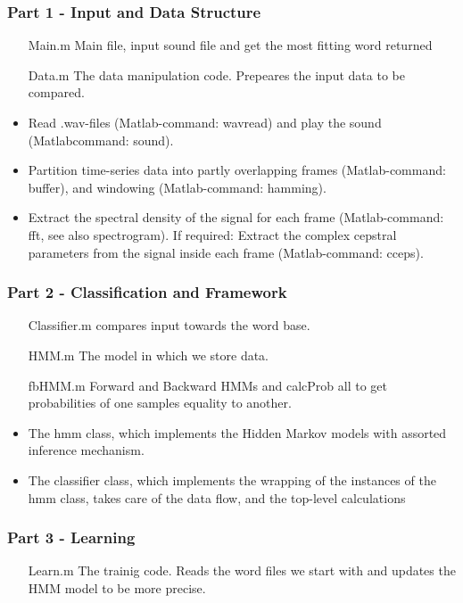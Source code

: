 \documentclass[titlepage]{article}
\begin{document}
	\subsubsection{Part 1 - Input and Data Structure}
\begin{itemize}
\item[Main.m] Main file, input sound file and get the most fitting word returned
\item[Data.m] The data manipulation code. Prepeares the input data to be compared.
\end{itemize}

\begin{itemize}
\item Read .wav-ﬁles (Matlab-command: wavread) and play the sound (Matlabcommand: sound).
\item Partition time-series data into partly overlapping frames (Matlab-command: buffer), and windowing (Matlab-command: hamming).
\item Extract the spectral density of the signal for each frame (Matlab-command: fft, see also spectrogram). If required: Extract the complex cepstral parameters from the signal inside each frame (Matlab-command: cceps).
\end{itemize}

	\subsubsection{Part 2 - Classification and Framework}
\begin{itemize}
\item[Classifier.m] compares input towards the word base. 
\item[HMM.m] The model in which we store data.
\item[fbHMM.m] Forward and Backward HMMs and calcProb all to get probabilities of one samples equality to another.
\end{itemize}

\begin{itemize}
\item The hmm class, which implements the Hidden Markov models with assorted inference mechanism.
\item The classifier class, which implements the wrapping of the instances of the hmm class, takes care of the data ﬂow, and the top-level calculations
\end{itemize}	

    \subsubsection{Part 3 - Learning}
\begin{itemize}
\item[Learn.m] The trainig code. Reads the word files we start with and updates the HMM model to be more precise.  
\end{itemize}
\end{document}
